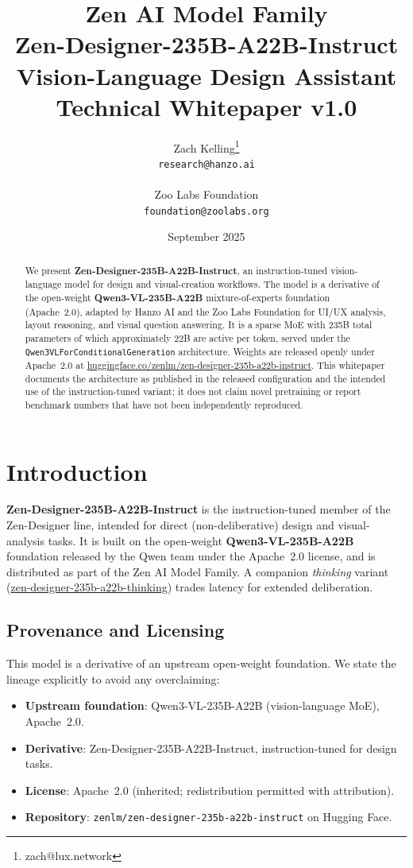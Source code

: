 \documentclass[11pt,a4paper]{article}
\title{
    \vspace{-2cm}
    \Large \textbf{Zen AI Model Family} \\
    \vspace{0.5cm}
    \Huge \textbf{Zen-Designer-235B-A22B-Instruct} \\
    \vspace{0.3cm}
    \large Vision-Language Design Assistant \\
    \vspace{0.5cm}
    \normalsize Technical Whitepaper v1.0
}
\author{
    Zach Kelling\thanks{zach@lux.network} \\
    \texttt{research@hanzo.ai} \\
    \\
    Zoo Labs Foundation \\
    \texttt{foundation@zoolabs.org}
}
\date{September 2025}
\begin{document}
\maketitle

\begin{abstract}
We present \textbf{Zen-Designer-235B-A22B-Instruct}, an instruction-tuned vision-language
model for design and visual-creation workflows. The model is a derivative of the
open-weight \textbf{Qwen3-VL-235B-A22B} mixture-of-experts foundation (Apache~2.0), adapted
by Hanzo AI and the Zoo Labs Foundation for UI/UX analysis, layout reasoning, and
visual question answering. It is a sparse MoE with 235B total parameters of which
approximately 22B are active per token, served under the \texttt{Qwen3VLForConditionalGeneration}
architecture. Weights are released openly under Apache~2.0 at
\href{https://huggingface.co/zenlm/zen-designer-235b-a22b-instruct}{huggingface.co/zenlm/zen-designer-235b-a22b-instruct}.
This whitepaper documents the architecture as published in the released configuration and the
intended use of the instruction-tuned variant; it does not claim novel pretraining or
report benchmark numbers that have not been independently reproduced.
\end{abstract}

\tableofcontents
\newpage

\section{Introduction}

\textbf{Zen-Designer-235B-A22B-Instruct} is the instruction-tuned member of the Zen-Designer
line, intended for direct (non-deliberative) design and visual-analysis tasks. It is built on
the open-weight \textbf{Qwen3-VL-235B-A22B} foundation released by the Qwen team under the
Apache~2.0 license, and is distributed as part of the Zen AI Model Family. A companion
\emph{thinking} variant (\href{https://huggingface.co/zenlm/zen-designer-235b-a22b-thinking}{zen-designer-235b-a22b-thinking})
trades latency for extended deliberation.

\subsection{Provenance and Licensing}
This model is a derivative of an upstream open-weight foundation. We state the lineage
explicitly to avoid any overclaiming:
\begin{itemize}
    \item \textbf{Upstream foundation}: Qwen3-VL-235B-A22B (vision-language MoE), Apache~2.0.
    \item \textbf{Derivative}: Zen-Designer-235B-A22B-Instruct, instruction-tuned for design tasks.
    \item \textbf{License}: Apache~2.0 (inherited; redistribution permitted with attribution).
    \item \textbf{Repository}: \texttt{zenlm/zen-designer-235b-a22b-instruct} on Hugging Face.
\end{itemize}
\end{document}
